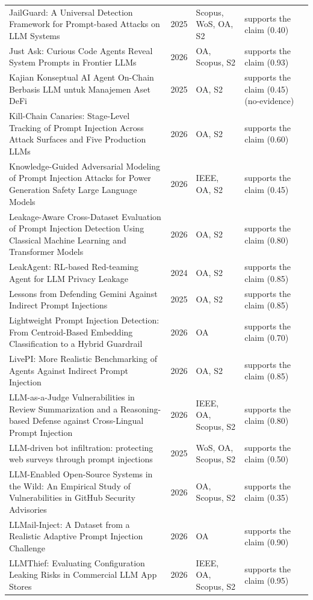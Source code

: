 \begin{longtable}{@{}%
  >{\raggedright\arraybackslash}p{}c%
  >{\raggedright\arraybackslash}p{}%
  >{\raggedright\arraybackslash}p{}@{}}
JailGuard: A Universal Detection Framework for Prompt-based Attacks on LLM Systems & 2025 & Scopus, WoS, OA, S2 & supports the claim (0.40) \\
Just Ask: Curious Code Agents Reveal System Prompts in Frontier LLMs & 2026 & OA, Scopus, S2 & supports the claim (0.93) \\
Kajian Konseptual AI Agent On-Chain Berbasis LLM untuk Manajemen Aset DeFi & 2025 & OA, S2 & supports the claim (0.45) (no-evidence) \\
Kill-Chain Canaries: Stage-Level Tracking of Prompt Injection Across Attack Surfaces and Five Production LLMs & 2026 & OA, S2 & supports the claim (0.60) \\
Knowledge-Guided Adversarial Modeling of Prompt Injection Attacks for Power Generation Safety Large Language Models & 2026 & IEEE, OA, S2 & supports the claim (0.45) \\
Leakage-Aware Cross-Dataset Evaluation of Prompt Injection Detection Using Classical Machine Learning and Transformer Models & 2026 & OA, S2 & supports the claim (0.80) \\
LeakAgent: RL-based Red-teaming Agent for LLM Privacy Leakage & 2024 & OA, S2 & supports the claim (0.85) \\
Lessons from Defending Gemini Against Indirect Prompt Injections & 2025 & OA, S2 & supports the claim (0.85) \\
Lightweight Prompt Injection Detection: From Centroid-Based Embedding Classification to a Hybrid Guardrail & 2026 & OA & supports the claim (0.70) \\
LivePI: More Realistic Benchmarking of Agents Against Indirect Prompt Injection & 2026 & OA, S2 & supports the claim (0.85) \\
LLM-as-a-Judge Vulnerabilities in Review Summarization and a Reasoning-based Defense against Cross-Lingual Prompt Injection & 2026 & IEEE, OA, Scopus, S2 & supports the claim (0.80) \\
LLM-driven bot infiltration: protecting web surveys through prompt injections & 2025 & WoS, OA, Scopus, S2 & supports the claim (0.50) \\
LLM-Enabled Open-Source Systems in the Wild: An Empirical Study of Vulnerabilities in GitHub Security Advisories & 2026 & OA, Scopus, S2 & supports the claim (0.35) \\
LLMail-Inject: A Dataset from a Realistic Adaptive Prompt Injection Challenge & 2026 & OA & supports the claim (0.90) \\
LLMThief: Evaluating Configuration Leaking Risks in Commercial LLM App Stores & 2026 & IEEE, OA, Scopus, S2 & supports the claim (0.95) \\

\end{longtable}
